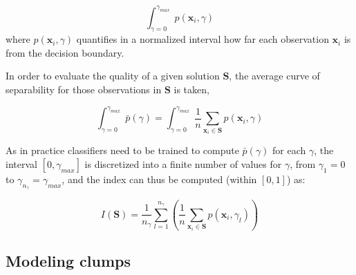 \begin{equation}
\int_{\gamma = 0}^{\gamma_{max}} p(\mathbf{x}_i, \gamma)
\end{equation}
where $p(\mathbf{x}_i, \gamma)$ quantifies in a normalized interval how far each observation $\mathbf{x}_i$ is from the decision boundary.

In order to evaluate the quality of a given solution $\mathbf{S}$, the average curve of separability for those observations in $\mathbf{S}$ is taken, 

\begin{equation}
\int_{\gamma = 0}^{\gamma_{max}} \bar{p}(\gamma) = \int_{\gamma = 0}^{\gamma_{max}} \frac{1}{n} \sum_{\mathbf{x}_i \in \mathbf{S}} p(\mathbf{x}_i, \gamma)
\label{eq:ireos:avg_curve}
\end{equation}

As in practice classifiers need to be trained to compute $\bar{p}(\gamma)$ for each $\gamma$, the interval $[0, \gamma_{max}]$ is discretized into a finite number of values for $\gamma$, from $\gamma_1 = 0$ to $\gamma_{n_\gamma} = \gamma_{max}$, and the index can thus be computed (within $[0, 1]$) as:

\begin{equation}
I(\mathbf{S}) = \frac{1}{n_{\gamma}} \sum_{l = 1}^{n_{\gamma}} \left( \frac{1}{n} \sum_{\mathbf{x}_i \in \mathbf{S}} p(\mathbf{x}_i, \gamma_l) \right)
\label{eq:original_ireos}
\end{equation}

\subsection{Modeling clumps}

